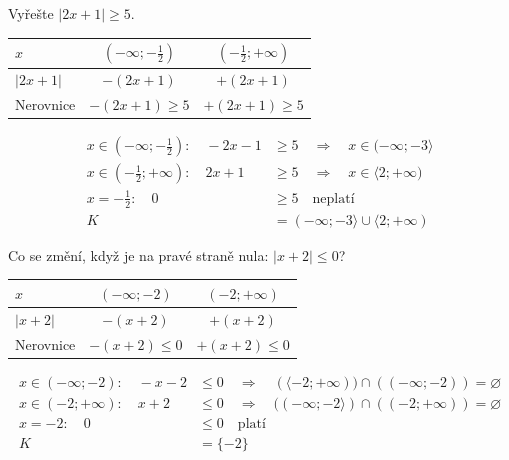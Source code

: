\documentclass[11pt,a4paper]{article}
\begin{document}
\begin{prikladReseniBox}[title={Příklad 2}]
Vyřešte $|2x+1|\ge5$.
\tcblower
\begin{center}
\begingroup\footnotesize
\renewcommand{\arraystretch}{1.32}
\begin{tabular}{@{}lcc@{}}
\toprule
$x$ & $(-\infty;- \frac{1}{2})$ & $(- \frac{1}{2};+\infty)$ \\
\midrule
$|2 x + 1|$ & $-(2 x + 1)$ & $+(2 x + 1)$ \\
\midrule
Nerovnice & $-(2 x + 1)\ge5$ & $+(2 x + 1)\ge5$ \\
\bottomrule
\end{tabular}
\endgroup
\end{center}
\[\begin{aligned}x\in (-\infty;- \frac{1}{2}):\quad - 2 x - 1 &\ge 5\quad\Longrightarrow\quad x\in(-\infty;-3\rangle\\[2pt]
x\in (- \frac{1}{2};+\infty):\quad 2 x + 1 &\ge 5\quad\Longrightarrow\quad x\in\langle2;+\infty)\\[2pt]
x=- \frac{1}{2}:\quad 0 &\ge 5\quad\text{neplatí}\\[2pt]
K&=(-\infty;-3\rangle\cup\langle2;+\infty)\end{aligned}\]
\end{prikladReseniBox}
\begin{prikladReseniBox}[title={Příklad 3}]
Co se změní, když je na pravé straně nula: $|x+2|\le0$?
\tcblower
\begin{center}
\begingroup\footnotesize
\renewcommand{\arraystretch}{1.32}
\begin{tabular}{@{}lcc@{}}
\toprule
$x$ & $(-\infty;-2)$ & $(-2;+\infty)$ \\
\midrule
$|x + 2|$ & $-(x + 2)$ & $+(x + 2)$ \\
\midrule
Nerovnice & $-(x + 2)\le0$ & $+(x + 2)\le0$ \\
\bottomrule
\end{tabular}
\endgroup
\end{center}
\[\begin{aligned}x\in (-\infty;-2):\quad - x - 2 &\le 0\quad\Longrightarrow\quad (\langle-2;+\infty))\cap((-\infty;-2))=\varnothing\\[2pt]
x\in (-2;+\infty):\quad x + 2 &\le 0\quad\Longrightarrow\quad ((-\infty;-2\rangle)\cap((-2;+\infty))=\varnothing\\[2pt]
x=-2:\quad 0 &\le 0\quad\text{platí}\\[2pt]
K&=\{-2\}\end{aligned}\]
\end{prikladReseniBox}
\end{document}

